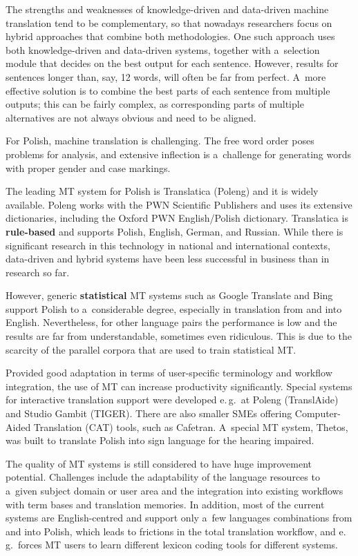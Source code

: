 \begin{multicols}{2}
The strengths and weaknesses of knowledge-driven and data-driven
machine translation tend to be complementary, so that nowadays
researchers focus on hybrid approaches that combine both
methodologies. One such approach uses both knowledge-driven and
data-driven systems, together with a~selection module that decides on
the best output for each sentence. However, results for sentences
longer than, say, 12 words, will often be far from perfect. A~more
effective solution is to combine the best parts of each sentence from
multiple outputs; this can be fairly complex, as corresponding parts
of multiple alternatives are not always obvious and need to be
aligned. 

For Polish, machine translation is challenging. The free word order
poses problems for analysis, and extensive inflection is a~challenge
for generating words with proper gender and case markings.


The leading MT system for Polish is Translatica (Poleng) and it is
widely available. Poleng works with the PWN Scientific Publishers and
uses its extensive dictionaries, including the Oxford PWN
English/Polish dictionary. Translatica is \textbf{rule-based} and
supports Polish, English, German, and Russian. While there is
significant research in this technology in national and international
contexts, data-driven and hybrid systems have been less successful in
business than in research so far. 

However, generic \textbf{statistical} MT systems such as Google
Translate and Bing support Polish to a~considerable degree, especially
in translation from and into English. Nevertheless, for other language
pairs the performance is low and the results are far from
understandable, sometimes even ridiculous. This is due to the scarcity
of the parallel corpora that are used to train statistical MT. 

Provided good adaptation in terms of user-specific terminology and
workflow integration, the use of MT can increase productivity
significantly. Special systems for interactive translation support
were developed e.\,g.~at Poleng (TranslAide) and Studio Gambit (TIGER).
There are also smaller SMEs offering Computer-Aided Translation (CAT)
tools, such as Cafetran. A~special MT system, Thetos, was built to
translate Polish into sign language for the hearing impaired. 

The quality of MT systems is still considered to have huge improvement
potential. Challenges include the adaptability of the language
resources to a~given subject domain or user area and the integration
into existing workflows with term bases and translation memories. In
addition, most of the current systems are English-centred and support
only a~few languages combinations from and into Polish, which leads to
frictions in the total translation workflow, and e.\,g.~forces MT users
to learn different lexicon coding tools for different systems. 


\end{multicols}
